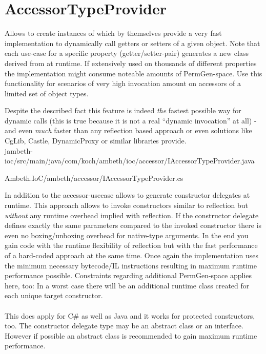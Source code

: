 \section{AccessorTypeProvider}
\label{feature:AccessorTypeProvider}
\ClearAPI
Allows to create instances of  which by themselves provide a very fast implementation to dynamically call getters or setters of a given object. Note that each use-case for a specific property (getter/setter-pair) generates a new class derived from  at runtime. If extensively used on thousands of different properties the implementation might consume noteable amounts of PermGen-space. Use this functionality for scenarios of very high invocation amount on accessors of a limited set of object types.

Despite the described fact this feature is indeed \emph{the} fastest possible way for dynamic calls (this is true because it is not a real ``dynamic invocation'' at all) - and even \emph{much} faster than any reflection based approach or even solutions like CgLib, Castle, DynamicProxy or similar libraries provide.\\

{jambeth-ioc/src/main/java/com/koch/ambeth/ioc/accessor/IAccessorTypeProvider.java}

{Ambeth.IoC/ambeth/accessor/IAccessorTypeProvider.cs}

In addition to the accessor-usecase  allows to generate constructor delegates at runtime. This approach allows to invoke constructors similar to reflection but \emph{without} any runtime overhead implied with reflection. If the constructor delegate defines exactly the same parameters compared to the invoked constructor there is even no boxing/unboxing overhead for native-type arguments. In the end you gain code with the runtime flexibility of reflection but with the fast performance of a hard-coded approach at the same time. Once again the implementation uses the minimum necessary bytecode/IL instructions resulting in maximum runtime performance possible. Constraints regarding additional PermGen-space applies here, too: In a worst case there will be an additional runtime class created for each unique target constructor.\\\\

This does apply for C\# as well as Java and it works for protected constructors, too. The constructor delegate type may be an abstract class or an interface. However if possible an abstract class is recommended to gain maximum runtime performance.

